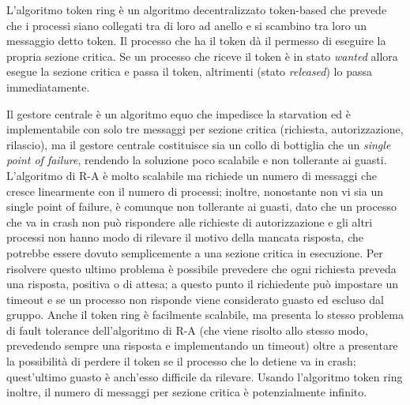 \documentclass[answers, a4paper, 11pt]{exam}
\begin{document}
\begin{questions}
\begin{parts}
\begin{solution}
L'algoritmo token ring è un algoritmo decentralizzato token-based che prevede che i processi siano collegati tra di loro ad anello e si scambino tra loro un messaggio detto token.
Il processo che ha il token dà il permesso di eseguire la propria sezione critica.
			Se un processo che riceve il token è in stato \textit{wanted} allora esegue la sezione critica e passa il token, altrimenti (stato \textit{released}) lo passa immediatamente.

			Il gestore centrale è un algoritmo equo che impedisce la starvation ed è implementabile con solo tre messaggi per sezione critica (richiesta, autorizzazione, rilascio), ma il gestore centrale costituisce sia un collo di bottiglia che un \textit{single point of failure}, rendendo la soluzione poco scalabile e non tollerante ai guasti.
			L'algoritmo di R-A è molto scalabile ma richiede un numero di messaggi che cresce linearmente con il numero di processi; inoltre, nonostante non vi sia un single point of failure, è comunque non tollerante ai guasti, dato che un processo che va in crash non può rispondere alle richieste di autorizzazione e gli altri processi non hanno modo di rilevare il motivo della mancata risposta, che potrebbe essere dovuto semplicemente a una sezione critica in esecuzione.
			Per risolvere questo ultimo problema è possibile prevedere che ogni richiesta preveda una risposta, positiva o di attesa; a questo punto il richiedente può impostare un timeout e se un processo non risponde viene considerato guasto ed escluso dal gruppo.
			Anche il token ring è facilmente scalabile, ma presenta lo stesso problema di fault tolerance dell'algoritmo di R-A (che viene risolto allo stesso modo, prevedendo sempre una risposta e implementando un timeout) oltre a presentare la possibilità di perdere il token se il processo che lo detiene va in crash; quest'ultimo guasto è anch'esso difficile da rilevare.
			Usando l'algoritmo token ring inoltre, il numero di messaggi per sezione critica è potenzialmente infinito.


\end{solution}
\end{parts}
\end{questions}
\end{document}

